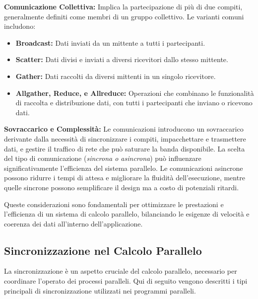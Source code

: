 \textbf{Comunicazione Collettiva:} Implica la
partecipazione di più di due compiti, generalmente
definiti come membri di un gruppo collettivo. Le varianti
comuni includono:
\begin{itemize}
    \item \textbf{Broadcast:} Dati inviati da un mittente
    a tutti i partecipanti.
    \item \textbf{Scatter:} Dati divisi e inviati a
    diversi ricevitori dallo stesso mittente.
    \item \textbf{Gather:} Dati raccolti da diversi
    mittenti in un singolo ricevitore.
    \item \textbf{Allgather, Reduce, e Allreduce:}
    Operazioni che combinano le funzionalità di raccolta
    e distribuzione dati, con tutti i partecipanti che
    inviano o ricevono dati.
\end{itemize}

\textbf{Sovraccarico e Complessità:} Le comunicazioni
introducono un sovraccarico derivante dalla necessità
di sincronizzare i compiti, impacchettare e trasmettere
dati, e gestire il traffico di rete che può saturare la
banda disponibile. La scelta del tipo di comunicazione
(\textit{sincrona o asincrona}) può influenzare
significativamente l'efficienza del sistema parallelo.
Le comunicazioni asincrone possono ridurre i tempi di
attesa e migliorare la fluidità dell'esecuzione, mentre
quelle sincrone possono semplificare il design ma a costo
di potenziali ritardi.

Queste considerazioni sono fondamentali per ottimizzare
le prestazioni e l'efficienza di un sistema di calcolo
parallelo, bilanciando le esigenze di velocità e coerenza
dei dati all'interno dell'applicazione.

\subsection{Sincronizzazione nel Calcolo Parallelo}
La sincronizzazione è un aspetto cruciale del calcolo
parallelo, necessario per coordinare l'operato dei
processi paralleli. Qui di seguito vengono descritti
i tipi principali di sincronizzazione utilizzati nei
programmi paralleli.

